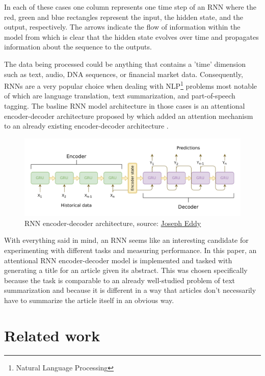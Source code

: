 \documentclass{article}
\begin{document}
\noindent In each of these cases one column represents one time step of an RNN where the red, green and blue rectangles represent the input, the hidden state, and the output, respectively. The arrows indicate the flow of information within the model from which is clear that the hidden state evolves over time and propagates information about the sequence to the outputs.

The data being processed could be anything that contains a 'time' dimension such as text, audio, DNA sequences, or financial market data. Consequently, RNNs are a very popular choice when dealing with NLP\footnote{Natural Language Processing} problems most notable of which are language translation, text summarization, and part-of-speech tagging. The basline RNN model architecture in those cases is an attentional encoder-decoder architecture proposed by \cite{bahdanau} which added an attention mechanism to an already existing encoder-decoder architecture \citep{original-enc-dec}.

\begin{figure}[H]
    \centering
    \includegraphics[scale=0.4]{images/enc_dec.png}
    \caption{RNN encoder-decoder architecture, source: \href{https://jeddy92.github.io/JEddy92.github.io/ts_seq2seq_intro/}{Joseph Eddy}}
\end{figure}

With everything said in mind, an RNN seems like an interesting candidate for experimenting with different tasks and measuring performance. In this paper, an attentional RNN encoder-decoder model is implemented and tasked with generating a title for an article given its abstract. This was chosen specifically because the task is comparable to an already well-studied problem of text summarization and because it is different in a way that articles don't necessarily have to summarize the article itself in an obvious way.

\section{Related work}
\end{document}
